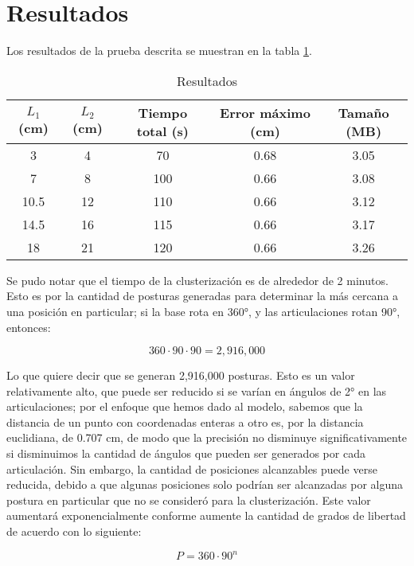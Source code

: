 \section{Resultados}

Los resultados de la prueba descrita se muestran en la tabla \ref{tab:Resultados}.

\begin{table}[ht]
	\centering
	\begin{tabular}{|c|c|c|c|c|}
		\hline
		\textbf{$L_1$ (cm)} & \textbf{$L_2$ (cm)} & \textbf{Tiempo total (s)} & \textbf{Error máximo (cm)} & \textbf{Tamaño (MB)} \\
		\hline
		3 & 4 & 70 & 0.68 & 3.05 \\
		7 & 8 & 100 & 0.66 & 3.08 \\
		10.5 & 12 & 110 & 0.66 & 3.12 \\
		14.5 & 16 & 115 & 0.66 & 3.17 \\
		18 & 21 & 120 & 0.66 & 3.26 \\
		\hline
	\end{tabular}
	\caption{Resultados}
	\label{tab:Resultados}
\end{table}

Se pudo notar que el tiempo de la clusterización es de alrededor de 2 minutos. Esto es por la cantidad de posturas generadas para determinar la más cercana a una posición en particular; si la base rota en 360°, y las articulaciones rotan 90°, entonces:

\begin{equation}
	360 \cdot 90 \cdot 90 = 2,916,000
\end{equation}

Lo que quiere decir que se generan 2,916,000 posturas. Esto es un valor relativamente alto, que puede ser reducido si se varían en ángulos de 2° en las articulaciones; por el enfoque que hemos dado al modelo, sabemos que la distancia de un punto con coordenadas enteras a otro es, por la distancia euclidiana, de 0.707 cm, de modo que la precisión no disminuye significativamente si disminuimos la cantidad de ángulos que pueden ser generados por cada articulación. Sin embargo, la cantidad de posiciones alcanzables puede verse reducida, debido a que algunas posiciones solo podrían ser alcanzadas por alguna postura en particular que no se consideró para la clusterización. Este valor aumentará exponencialmente conforme aumente la cantidad de grados de libertad de acuerdo con lo siguiente:

\begin{equation}
	P = 360 \cdot 90^n
\end{equation}

